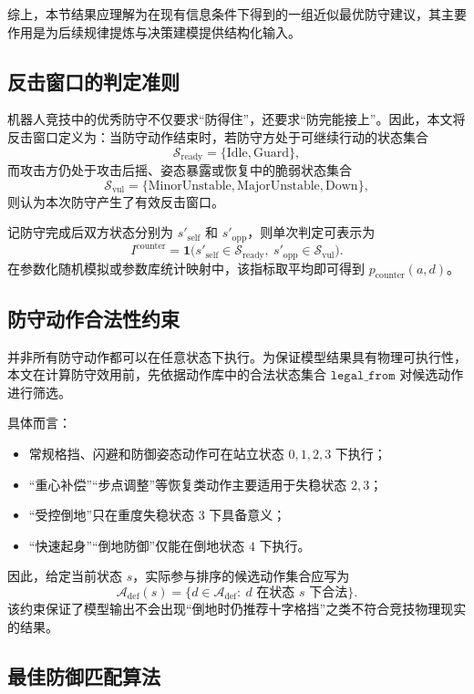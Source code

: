 综上，本节结果应理解为在现有信息条件下得到的一组近似最优防守建议，其主要作用是为后续规律提炼与决策建模提供结构化输入。

\subsection{反击窗口的判定准则}

机器人竞技中的优秀防守不仅要求“防得住”，还要求“防完能接上”。因此，本文将反击窗口定义为：当防守动作结束时，若防守方处于可继续行动的状态集合
\[
\mathcal{S}_{\text{ready}}=\{\text{Idle},\text{Guard}\},
\]
而攻击方仍处于攻击后摇、姿态暴露或恢复中的脆弱状态集合
\[
\mathcal{S}_{\text{vul}}=\{\text{MinorUnstable},\text{MajorUnstable},\text{Down}\},
\]
则认为本次防守产生了有效反击窗口。

记防守完成后双方状态分别为 \(s'_{\text{self}}\) 和 \(s'_{\text{opp}}\)，则单次判定可表示为
\[
I^{\text{counter}}
=
\mathbf{1}\big(s'_{\text{self}}\in\mathcal{S}_{\text{ready}},
\ s'_{\text{opp}}\in\mathcal{S}_{\text{vul}}\big).
\]
在参数化随机模拟或参数库统计映射中，该指标取平均即可得到 \(p_{\text{counter}}(a,d)\)。

\subsection{防守动作合法性约束}

并非所有防守动作都可以在任意状态下执行。为保证模型结果具有物理可执行性，本文在计算防守效用前，先依据动作库中的合法状态集合 \(\texttt{legal\_from}\) 对候选动作进行筛选。

具体而言：
\begin{itemize}
    \item 常规格挡、闪避和防御姿态动作可在站立状态 \(0,1,2,3\) 下执行；
    \item “重心补偿”“步点调整”等恢复类动作主要适用于失稳状态 \(2,3\)；
    \item “受控倒地”只在重度失稳状态 \(3\) 下具备意义；
    \item “快速起身”“倒地防御”仅能在倒地状态 \(4\) 下执行。
\end{itemize}

因此，给定当前状态 \(s\)，实际参与排序的候选动作集合应写为
\[
\mathcal{A}_{\text{def}}(s)=\{d\in\mathcal{A}_{\text{def}}:\ d \text{ 在状态 } s \text{ 下合法}\}.
\]
该约束保证了模型输出不会出现“倒地时仍推荐十字格挡”之类不符合竞技物理现实的结果。

\subsection{最佳防御匹配算法}

